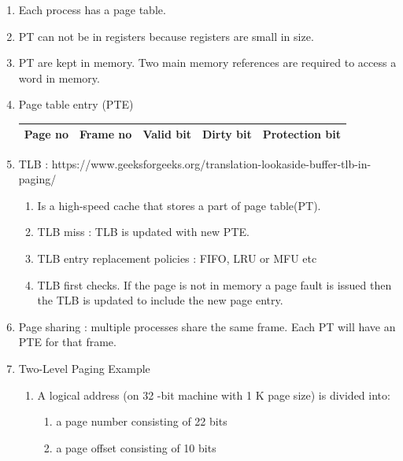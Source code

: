 \begin{enumerate}
  \item Each process has a page table.
  \item PT can not be in registers because registers are small in size.
  \item PT are kept in memory. Two main memory references are required to access a word in memory.
  \item Page table entry (PTE) \\
  \begin{myTableStyle}
    \begin{tabular}{ |m{2cm}|m{2cm}|m{2cm}|m{2cm}|m{3cm}| } \hline
        Page no &  Frame no & Valid bit & Dirty bit & Protection bit  \\ \hline
    \end{tabular}
  \end{myTableStyle}
  \vspace{0.08in}


  \item TLB : https://www.geeksforgeeks.org/translation-lookaside-buffer-tlb-in-paging/
    \begin{enumerate}
      \item Is a high-speed cache that stores a part of page table(PT).
      \item TLB miss : TLB is updated with new PTE.
      \item TLB entry replacement policies : FIFO, LRU or MFU etc
      \item TLB first checks. If the page is not in memory a page fault is issued then the TLB is updated to include the new page entry.
    \end{enumerate}
    \vspace{0.08in}

    \item Page sharing : multiple processes share the same  frame. Each PT will have an PTE for that frame.
    \vspace{0.08in}

    \item Two-Level Paging Example
    \begin{enumerate}
      \item  A logical address (on 32 -bit machine with 1 K page size) is divided into:
      \begin{enumerate}
          \item a page number consisting of 22 bits
          \item a page offset consisting of 10 bits
      \end{enumerate}


\end{enumerate}
\end{enumerate}
